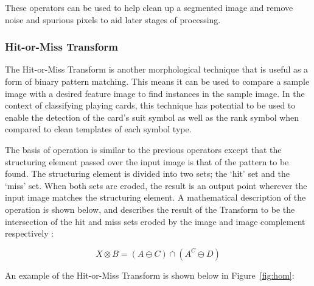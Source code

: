 \documentclass[a4paper,12pt,notitlepage]{article}
\begin{document}
			These operators can be used to help clean up a segmented image and remove noise and spurious pixels to aid later stages of processing.
		\subsubsection{Hit-or-Miss Transform}
			The Hit-or-Miss Transform is another morphological technique that is useful as a form of binary pattern matching. This means it can be used to compare a sample image with a desired feature image to find instances in the sample image. In the context of classifying playing cards, this technique has potential to be used to enable the detection of the card's suit symbol as well as the rank symbol when compared to clean templates of each symbol type.

			The basis of operation is similar to the previous operators except that the structuring element passed over the input image is that of the pattern to be found. The structuring element is divided into two sets; the `hit' set and the `miss' set. When both sets are eroded, the result is an output point wherever the input image matches the structuring element. A mathematical description of the operation is shown below, and describes the result of the Transform to be the intersection of the hit and miss sets eroded by the image and image complement respectively \autocite{badea}:

			\begin{equation}
				X \otimes B = ( A \ominus C ) \cap ( A^C \ominus D )
			\end{equation}

			An example of the Hit-or-Miss Transform is shown below in Figure~\ref{fig:hom}:
\end{document}
